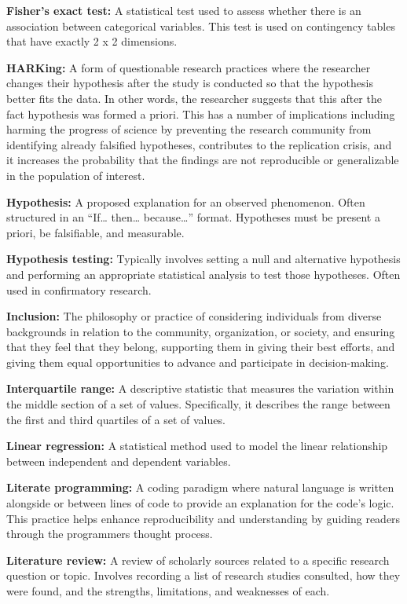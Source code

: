 \documentclass[
]{book}
\begin{document}
\textbf{Fisher's exact test:} A statistical test used to assess whether there is an association between categorical variables. This test is used on contingency tables that have exactly 2 x 2 dimensions.

\textbf{HARKing:} A form of questionable research practices where the researcher changes their hypothesis after the study is conducted so that the hypothesis better fits the data. In other words, the researcher suggests that this after the fact hypothesis was formed a priori. This has a number of implications including harming the progress of science by preventing the research community from identifying already falsified hypotheses, contributes to the replication crisis, and it increases the probability that the findings are not reproducible or generalizable in the population of interest.

\textbf{Hypothesis:} A proposed explanation for an observed phenomenon. Often structured in an ``If\ldots{} then\ldots{} because\ldots{}'' format. Hypotheses must be present a priori, be falsifiable, and measurable.

\textbf{Hypothesis testing:} Typically involves setting a null and alternative hypothesis and performing an appropriate statistical analysis to test those hypotheses. Often used in confirmatory research.

\textbf{Inclusion:} The philosophy or practice of considering individuals from diverse backgrounds in relation to the community, organization, or society, and ensuring that they feel that they belong, supporting them in giving their best efforts, and giving them equal opportunities to advance and participate in decision-making.

\textbf{Interquartile range:} A descriptive statistic that measures the variation within the middle section of a set of values. Specifically, it describes the range between the first and third quartiles of a set of values.

\textbf{Linear regression:} A statistical method used to model the linear relationship between independent and dependent variables.

\textbf{Literate programming:} A coding paradigm where natural language is written alongside or between lines of code to provide an explanation for the code's logic. This practice helps enhance reproducibility and understanding by guiding readers through the programmers thought process.

\textbf{Literature review:} A review of scholarly sources related to a specific research question or topic. Involves recording a list of research studies consulted, how they were found, and the strengths, limitations, and weaknesses of each.
\end{document}
